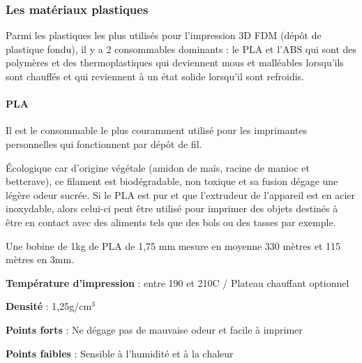 \documentclass{article}
\begin{document}
\subsubsection{Les matériaux plastiques}

Parmi les plastiques les plus utilisés pour l'impression 3D FDM (dépôt de plastique fondu), il y a 2 consommables dominants : le PLA et l'ABS qui sont des polymères et des thermoplastiques qui deviennent mous et malléables lorsqu'ils sont chauffés et qui reviennent à un état solide lorsqu'il sont refroidis.

\paragraph{PLA} \hfill

Il est le consommable le plus couramment utilisé pour les imprimantes personnelles qui fonctionnent par dépôt de fil.\hfill 
 \par\leavevmode\par
Écologique car d'origine végétale (amidon de maïs, racine de manioc et betterave), ce filament est biodégradable, non toxique et sa fusion dégage une légère odeur sucrée. Si le PLA est pur et que l'extrudeur de l'appareil est en acier inoxydable, alors celui-ci peut être utilisé pour imprimer des objets destinés à être en contact avec des aliments tels que des bols ou des tasses par exemple.\hfill  \par\leavevmode\par
Une bobine de 1kg de PLA de 1,75 mm mesure en moyenne 330 mètres et 115 mètres en 3mm.\hfill 
 \par\leavevmode\par
\textbf{Température d'impression} : entre 190 et 210\degres C / Plateau chauffant optionnel\hfill

\textbf{Densité} : 1,25g/cm$^{3}$\hfill

\textbf{Points forts} : Ne dégage pas de mauvaise odeur et facile à imprimer\hfill

\textbf{Points faibles} : Sensible à l'humidité et à la chaleur\hfill
 \par\leavevmode\par
{}
 \par\leavevmode\par
\end{document}
